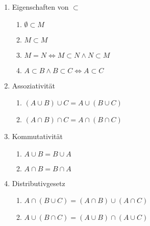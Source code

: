 \documentclass[../ana1.tex]{subfiles}
\begin{document}
\begin{enumerate}
	\item Eigenschaften von \glqq $\subset$\grqq
	      \begin{enumerate}
		      \item $\emptyset \subset M$
		      \item $M\subset M$
		      \item $M=N \Leftrightarrow M\subset N \wedge N\subset M$
		      \item $A\subset B \wedge B \subset C \Leftrightarrow A \subset C$
	      \end{enumerate}
	\item Assoziativität
	      \begin{enumerate}
		      \item $(A\cup B) \cup C = A \cup (B \cup C)$
		      \item $(A\cap B) \cap C = A \cap (B \cap C)$
	      \end{enumerate}
	\item Kommutativität
	      \begin{enumerate}
		      \item $A\cup B = B \cup A$
		      \item $A\cap B = B \cap A$
	      \end{enumerate}
	\item Distributivgesetz
	      \begin{enumerate}
		      \item $A \cap (B\cup C) = (A\cap B) \cup (A\cap C)$
		      \item $A \cup (B\cap C) = (A\cup B) \cap (A\cup C)$
	      \end{enumerate}
\end{enumerate}
\end{document}
